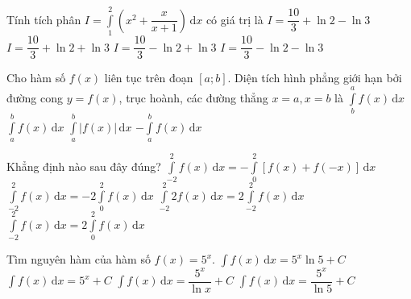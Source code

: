 \begin{ex}%
Tính tích phân $I=\displaystyle\int\limits_1^2\left(x^2+\dfrac{x}{x+1}\right)\mathrm{\,d}x$ có giá trị là
\choice
{\True $I=\dfrac{10}{3}+\ln 2-\ln 3$}
{$I=\dfrac{10}{3}+\ln 2+\ln 3$}
{$I=\dfrac{10}{3}-\ln 2+\ln 3$}
{$I=\dfrac{10}{3}-\ln 2-\ln 3$}
\end{ex}

\begin{ex}%
Cho hàm số $f(x)$ liên tục trên đoạn $[a;b]$. Diện tích hình phẳng giới hạn bởi đường cong $y=f(x)$, trục hoành, các đường thẳng $x=a,x=b$ là
\choice
{$\displaystyle\int\limits_b^af(x)\mathrm{\,d}x$}
{$\displaystyle\int\limits_a^bf(x)\mathrm{\,d}x$}
{\True $\displaystyle\int\limits_a^b\left|f(x)\right|\mathrm{\,d}x$}
{$-\displaystyle\int\limits_a^bf(x)\mathrm{\,d}x$} 
\end{ex}

\begin{ex}%
Khẳng định nào sau đây đúng?
\choice
{$\displaystyle\int\limits_{-2}^{2}f(x)\mathrm{\,d}x=-\displaystyle\int\limits_0^2\left[f(x)+f(-x)\right]\mathrm{\,d}x$}
{$\displaystyle\int\limits_{-2}^{2}f(x)\mathrm{\,d}x=-2\displaystyle\int\limits_0^2f(x)\mathrm{\,d}x$}
{\True $\displaystyle\int\limits_{-2}^{2}2f(x)\mathrm{\,d}x=2\displaystyle\int\limits_{-2}^{2}f(x)\mathrm{\,d}x$}
{$\displaystyle\int\limits_{-2}^{2}f(x)\mathrm{\,d}x=2\displaystyle\int\limits_0^2f(x)\mathrm{\,d}x$}
\end{ex}

\begin{ex}%
Tìm nguyên hàm của hàm số $f(x)=5^x$.
\choice
{$\displaystyle\int f(x)\mathrm{\,d}x=5^x\ln 5+C$}
{$\displaystyle\int f(x)\mathrm{\,d}x=5^x+C$}
{$\displaystyle\int f(x)\mathrm{\,d}x=\dfrac{5^x}{\ln x}+C$}
{\True $\displaystyle\int f(x)\mathrm{\,d}x=\dfrac{5^x}{\ln 5}+C$}
\end{ex}

